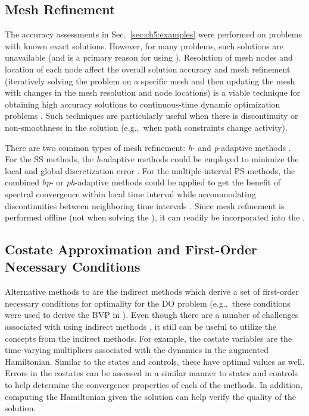 \subsection{Mesh Refinement} \label{sec:ch5:meshrefinement}

The accuracy assessments in Sec.~\ref{sec:ch5:examples} were performed on problems with known exact solutions.
However, for many \lqdo{} problems, such solutions are unavailable (and is a primary reason for using \dt{}).
Resolution of mesh nodes and location of each node affect the overall solution accuracy and mesh refinement (iteratively solving the problem on a specific mesh and then updating the mesh with changes in the mesh resolution and node locations) is a viable technique for obtaining high accuracy solutions to continuous-time dynamic optimization problems \cite{Betts1998b, Darby2009b}.
Such techniques are particularly useful when there is discontinuity or non-smoothness in the solution (e.g.,~when path constraints change activity).

There are two common types of mesh refinement: \textit{h}- and \textit{p}-adaptive methods \cite{zhao2017a}.
For the SS methods, the \textit{h}-adaptive methods could be employed to minimize the local and global discretization error \cite{Betts1998b, Betts2000a, Jain2008a}.
For the multiple-interval PS methods, the combined \textit{hp}- or \textit{ph}-adaptive methods could be applied to get the benefit of spectral convergence within local time interval while accommodating discontinuities between neighboring time intervals \cite{Darby2009b, Darby2011a, Fujikawa2014a, Patterson2015a}.
Since mesh refinement is performed offline (not when solving the \qp), it can readily be incorporated into the \apgp.

\subsection{Costate Approximation and First-Order Necessary Conditions}

Alternative methods to \dt{} are the indirect methods which derive a set of first-order necessary conditions for optimality for the DO problem (e.g.,~these conditions were used to derive the BVP in ).
Even though there are a number of challenges associated with using indirect methods \cite{Betts2010a, Biegler2010a, Bryson1975a, Herber2014a}, it still can be useful to utilize the concepts from the indirect methods.
For example, the costate variables are the time-varying multipliers associated with the dynamics in the augmented Hamiltonian.
Similar to the states and controls, these have optimal values as well.
Errors in the costates can be assessed in a similar manner to states and controls to help determine the convergence properties of each of the methods.
In addition, computing the Hamiltonian given the \dt{} solution can help verify the quality of the solution.

